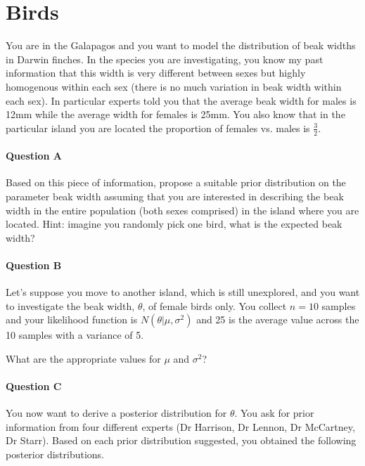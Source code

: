 
\section{Birds}

        You are in the Galapagos and you want to model the distribution of beak widths in
        Darwin finches.
        In the species you are investigating, you know my past information that this width is
        very different between sexes but highly homogenous within each sex (there is no much
        variation in beak width within each sex).
        In particular experts told you that the average beak width for males is 12mm while the
        average width for females is 25mm.
        You also know that in the particular island you are located the proportion of females vs. males
        is $\frac{3}{2}$.

        \paragraph{Question A}

        Based on this piece of information, propose a suitable prior distribution on the
        parameter beak width assuming that you are interested in describing the beak width in the
        entire population (both sexes comprised) in the island where you are located.
        Hint: imagine you randomly pick one bird, what is the expected beak width?

        \paragraph{Question B}

        Let's suppose you move to another island, which is still unexplored, and you want to investigate
        the beak width, $\theta$, of female birds only.
        You collect $n=10$ samples and your likelihood function is $N(\theta | \mu,\sigma^2)$
        and 25 is the average value across the 10 samples with a variance of 5.

        What are the appropriate values for $\mu$ and $\sigma^2$?

	\paragraph{Question C}

        You now want to derive a posterior distribution
        for $\theta$. You ask for prior information from four different experts (Dr Harrison, Dr Lennon,
        Dr McCartney, Dr Starr). Based on each prior distribution suggested, you obtained the following
        posterior distributions.

